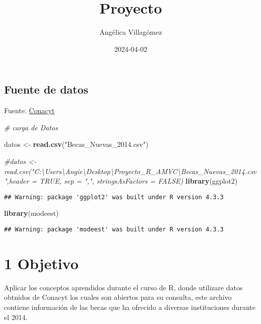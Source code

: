 \documentclass[
]{article}
\title{Proyecto}
\author{Angélica Villagómez}
\date{2024-04-02}
\newenvironment{Shaded}{\begin{snugshade}}{\end{snugshade}}
\newcommand{\CommentTok}[1]{\textcolor[rgb]{0.56,0.35,0.01}{\textit{#1}}}
\newcommand{\FunctionTok}[1]{\textcolor[rgb]{0.13,0.29,0.53}{\textbf{#1}}}
\newcommand{\NormalTok}[1]{#1}
\newcommand{\OtherTok}[1]{\textcolor[rgb]{0.56,0.35,0.01}{#1}}
\newcommand{\StringTok}[1]{\textcolor[rgb]{0.31,0.60,0.02}{#1}}
\begin{document}
\maketitle

\hypertarget{fuente-de-datos}{%
\subsection{Fuente de datos}\label{fuente-de-datos}}

Fuente:
\href{https://www.siicyt.gob.mx/index.php/estadisticas/bases-de-datos-abiertas?id=96}{Conacyt}

\begin{Shaded}
\begin{Highlighting}[]
\CommentTok{\# carga de Datos}

\NormalTok{datos }\OtherTok{\textless{}{-}} \FunctionTok{read.csv}\NormalTok{(}\StringTok{"Becas\_Nuevas\_2014.csv"}\NormalTok{)}

\CommentTok{\#datos \textless{}{-} read.csv("C:\textbackslash{}Users\textbackslash{}Angie\textbackslash{}Desktop\textbackslash{}Proyecto\_R\_AMVC\textbackslash{}Becas\_Nuevas\_2014.csv",header = TRUE, sep = ",", stringsAsFactors = FALSE)}
\FunctionTok{library}\NormalTok{(ggplot2)}
\end{Highlighting}
\end{Shaded}

\begin{verbatim}
## Warning: package 'ggplot2' was built under R version 4.3.3
\end{verbatim}

\begin{Shaded}
\begin{Highlighting}[]
\FunctionTok{library}\NormalTok{(modeest)}
\end{Highlighting}
\end{Shaded}

\begin{verbatim}
## Warning: package 'modeest' was built under R version 4.3.3
\end{verbatim}

\hypertarget{objetivo}{%
\section{1 Objetivo}\label{objetivo}}

Aplicar los conceptos aprendidos durante el curso de R, donde utilizare
datos obtnidos de Conacyt los cuales son abiertos para su consulta, este
archivo contiene información de las becas que ha ofrecido a diversas
instituciones durante el 2014.
\end{document}
